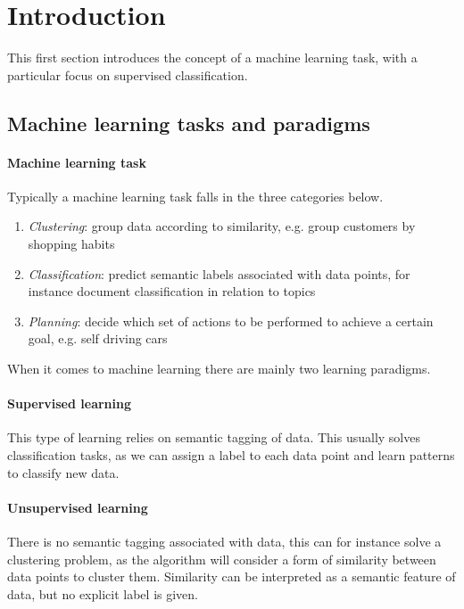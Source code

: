 \section{Introduction}

This first section introduces the concept of a machine learning task, with a particular
focus on supervised classification. 

\subsection{Machine learning tasks and paradigms}

\paragraph{Machine learning task}
Typically a machine learning task falls in the three categories below.
\begin{enumerate}
    \item \emph{Clustering}: group data according to similarity, e.g. group customers by 
    shopping habits
    \item \emph{Classification}: predict semantic labels associated with data points, 
    for instance document classification in relation to topics
    \item \emph{Planning}: decide which set of actions to be performed to achieve a 
    certain goal, e.g. self driving cars
\end{enumerate}

When it comes to machine learning there are mainly two learning paradigms.

\paragraph{Supervised learning}
This type of learning relies on semantic tagging of data.
This usually solves classification tasks, as we can assign a label to each data point 
and learn patterns to classify new data.

\paragraph{Unsupervised learning}
There is no semantic tagging associated with data, this can for instance solve a clustering 
problem, as the algorithm will consider a form of similarity between data points 
to cluster them. 
Similarity can be interpreted as a semantic feature of data, but no explicit label is given.


